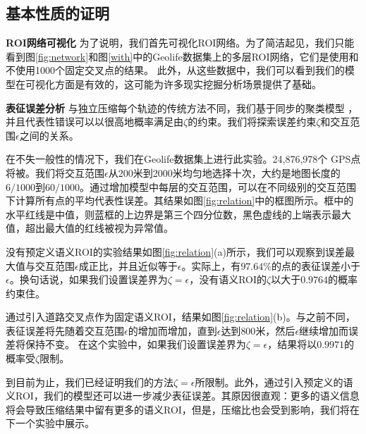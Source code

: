 

\subsection{基本性质的证明}
\vspace{3mm}
\noindent\textbf{ROI网络可视化}
为了说明，我们首先可视化ROI网络。为了简洁起见，我们只能看到图\ref{fig:network}和图\ref{with}中的Geolife数据集上的多层ROI网络，它们是使用和不使用1000个固定交叉点的结果。 此外，从这些数据中，我们可以看到我们的模型在可视化方面是有效的，这可能为许多现实挖掘分析场景提供了基础。


\vspace{3mm}
\noindent\textbf{表征误差分析}
与独立压缩每个轨迹的传统方法不同，我们基于同步的聚类模型 ，并且代表性错误可以以很高地概率满足由$\zeta$的约束。我们将探索误差约束$\zeta$和交互范围$\epsilon$之间的关系。

在不失一般性的情况下，我们在Geolife数据集上进行此实验。24,876,978个 GPS点将被。我们将交互范围$\epsilon$从200米到2000米均匀地选择十次，大约是地图长度的$6/1000$到$60/1000$。通过增加模型中每层的交互范围，可以在不同级别的交互范围下计算所有点的平均代表性误差。其结果如图\ref{fig:relation}中的框图所示。框中的水平红线是中值，则蓝框的上边界是第三个四分位数，黑色虚线的上端表示最大值，超出最大值的红线被视为异常值。

没有预定义语义ROI的实验结果如图\ref{fig:relation}(a)所示，我们可以观察到误差最大值与交互范围$\epsilon$成正比，并且近似等于$\epsilon$。实际上，有$97.64\%$的点的表征误差小于$\epsilon$。换句话说，如果我们设置误差界为$\zeta=\epsilon$，没有语义ROI的$\zeta$以大于$0.9764$的概率约束住。

通过引入道路交叉点作为固定语义ROI，结果如图\ref{fig:relation}(b)。与之前不同，表征误差将先随着交互范围$\epsilon$的增加而增加，直到$\epsilon$达到$800$米，然后$\epsilon$继续增加而误差将保持不变。 在这个实验中，如果我们设置误差界为$ \zeta =\epsilon $，结果将以$ 0.9971 $的概率受$ \zeta $限制。

到目前为止，我们已经证明我们的方法$ \zeta = \epsilon$所限制。此外，通过引入预定义的语义ROI，我们的模型还可以进一步减少表征误差。其原因很直观：更多的语义信息将会导致压缩结果中留有更多的语义ROI，但是，压缩比也会受到影响，我们将在下一个实验中展示。

